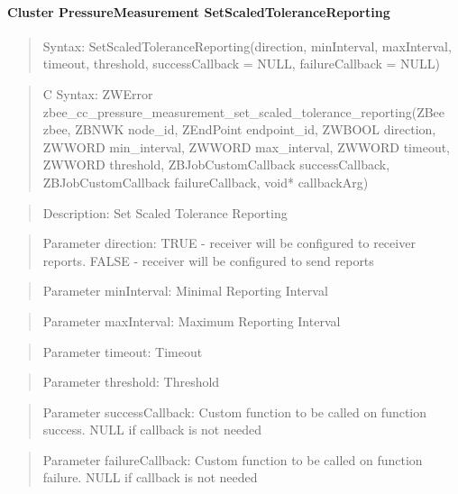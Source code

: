 \paragraph{Cluster PressureMeasurement SetScaledToleranceReporting}
\begin{quote}Syntax: SetScaledToleranceReporting(direction, minInterval, maxInterval, timeout, threshold, successCallback = NULL, failureCallback = NULL)\end{quote}
\begin{quote}C Syntax: ZWError zbee\_cc\_pressure\_measurement\_set\_scaled\_tolerance\_reporting(ZBee zbee, ZBNWK node\_id, ZEndPoint endpoint\_id, ZWBOOL direction, ZWWORD min\_interval, ZWWORD max\_interval, ZWWORD timeout, ZWWORD threshold, ZBJobCustomCallback successCallback, ZBJobCustomCallback failureCallback, void* callbackArg)\end{quote}
\begin{quote}Description: Set Scaled Tolerance Reporting\end{quote}
\begin{quote}Parameter direction: TRUE  - receiver will be configured to receiver reports. FALSE - receiver will be configured to send reports\end{quote}
\begin{quote}Parameter minInterval: Minimal Reporting Interval\end{quote}
\begin{quote}Parameter maxInterval: Maximum Reporting Interval\end{quote}
\begin{quote}Parameter timeout: Timeout\end{quote}
\begin{quote}Parameter threshold: Threshold\end{quote}
\begin{quote}Parameter successCallback: Custom function to be called on function success. NULL if callback is not needed\end{quote}
\begin{quote}Parameter failureCallback: Custom function to be called on function failure. NULL if callback is not needed\end{quote}


